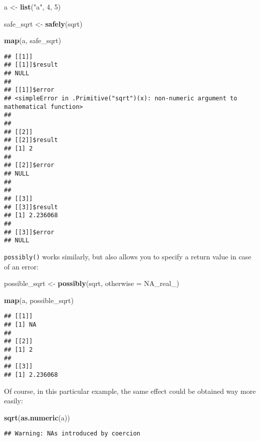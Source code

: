 \documentclass[
]{article}
\newenvironment{Shaded}{\begin{snugshade}}{\end{snugshade}}
\newcommand{\DataTypeTok}[1]{\textcolor[rgb]{0.13,0.29,0.53}{#1}}
\newcommand{\DecValTok}[1]{\textcolor[rgb]{0.00,0.00,0.81}{#1}}
\newcommand{\KeywordTok}[1]{\textcolor[rgb]{0.13,0.29,0.53}{\textbf{#1}}}
\newcommand{\NormalTok}[1]{#1}
\newcommand{\OtherTok}[1]{\textcolor[rgb]{0.56,0.35,0.01}{#1}}
\newcommand{\StringTok}[1]{\textcolor[rgb]{0.31,0.60,0.02}{#1}}
\begin{document}
\begin{Shaded}
\begin{Highlighting}[]
\NormalTok{a \textless{}{-}}\StringTok{ }\KeywordTok{list}\NormalTok{(}\StringTok{"a"}\NormalTok{, }\DecValTok{4}\NormalTok{, }\DecValTok{5}\NormalTok{)}

\NormalTok{safe\_sqrt \textless{}{-}}\StringTok{ }\KeywordTok{safely}\NormalTok{(sqrt)}

\KeywordTok{map}\NormalTok{(a, safe\_sqrt)}
\end{Highlighting}
\end{Shaded}

\begin{verbatim}
## [[1]]
## [[1]]$result
## NULL
## 
## [[1]]$error
## <simpleError in .Primitive("sqrt")(x): non-numeric argument to mathematical function>
## 
## 
## [[2]]
## [[2]]$result
## [1] 2
## 
## [[2]]$error
## NULL
## 
## 
## [[3]]
## [[3]]$result
## [1] 2.236068
## 
## [[3]]$error
## NULL
\end{verbatim}

\texttt{possibly()} works similarly, but also allows you to specify a return value in case of an error:

\begin{Shaded}
\begin{Highlighting}[]
\NormalTok{possible\_sqrt \textless{}{-}}\StringTok{ }\KeywordTok{possibly}\NormalTok{(sqrt, }\DataTypeTok{otherwise =} \OtherTok{NA\_real\_}\NormalTok{)}

\KeywordTok{map}\NormalTok{(a, possible\_sqrt)}
\end{Highlighting}
\end{Shaded}

\begin{verbatim}
## [[1]]
## [1] NA
## 
## [[2]]
## [1] 2
## 
## [[3]]
## [1] 2.236068
\end{verbatim}

Of course, in this particular example, the same effect could be obtained way more easily:

\begin{Shaded}
\begin{Highlighting}[]
\KeywordTok{sqrt}\NormalTok{(}\KeywordTok{as.numeric}\NormalTok{(a))}
\end{Highlighting}
\end{Shaded}

\begin{verbatim}
## Warning: NAs introduced by coercion
\end{verbatim}
\end{document}
